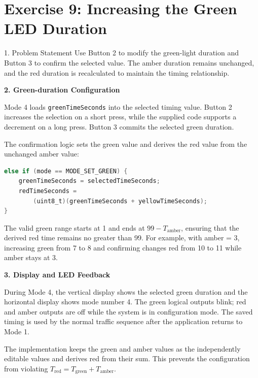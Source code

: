 \clearpage
\section*{Exercise 9: Increasing the Green LED Duration}

\begin{questionbox}{1. Problem Statement}
Use Button 2 to modify the green-light duration and Button 3 to confirm the selected value. The amber duration remains unchanged, and the red duration is recalculated to maintain the timing relationship.
\end{questionbox}

\vspace{0.4cm}
\textbf{2. Green-duration Configuration}

Mode 4 loads \texttt{greenTimeSeconds} into the selected timing value. Button 2 increases the selection on a short press, while the supplied code supports a decrement on a long press. Button 3 commits the selected green duration.

The confirmation logic sets the green value and derives the red value from the unchanged amber value:

\begin{lstlisting}[language=C, caption={Green timing confirmation}, label={lst:exercise9_green_confirm}, captionpos=b]
else if (mode == MODE_SET_GREEN) {
    greenTimeSeconds = selectedTimeSeconds;
    redTimeSeconds =
        (uint8_t)(greenTimeSeconds + yellowTimeSeconds);
}
\end{lstlisting}

The valid green range starts at 1 and ends at \(99 - T_{\mathrm{amber}}\), ensuring that the derived red time remains no greater than 99. For example, with amber = 3, increasing green from 7 to 8 and confirming changes red from 10 to 11 while amber stays at 3.

\textbf{3. Display and LED Feedback}

During Mode 4, the vertical display shows the selected green duration and the horizontal display shows mode number 4. The green logical outputs blink; red and amber outputs are off while the system is in configuration mode. The saved timing is used by the normal traffic sequence after the application returns to Mode 1.

\begin{resultbox}
The implementation keeps the green and amber values as the independently editable values and derives red from their sum. This prevents the configuration from violating \(T_{\mathrm{red}} = T_{\mathrm{green}} + T_{\mathrm{amber}}\).
\end{resultbox}

